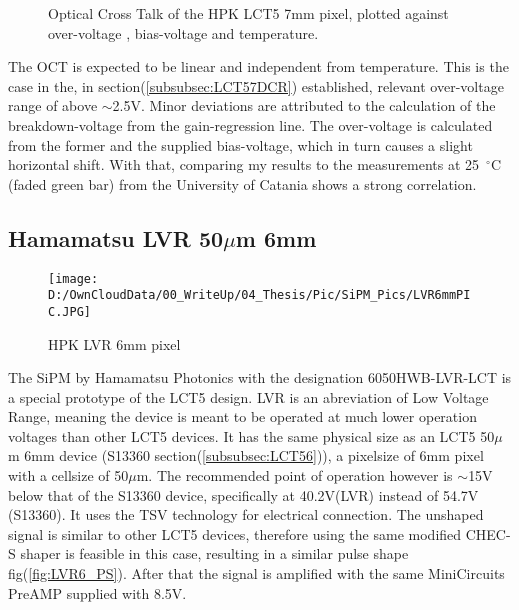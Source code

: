 \documentclass[12pt,article,type=msc,colorback,accentcolor=tud9c]{tudthesis}
\begin{document}
\begin{figure}[b!]
\begin{centering}
\caption[LCT5 7mm OCT]{Optical Cross Talk of the HPK LCT5 7mm pixel, plotted against over-voltage , bias-voltage and temperature.}
\label{fig:LCT57_OCT}
\end{centering}
\end{figure}
The OCT is expected to be linear and independent from temperature. This is the case in the, in section(\ref{subsubsec:LCT57DCR}) established, relevant over-voltage range of above $\sim$2.5V. Minor deviations are attributed to the calculation of the breakdown-voltage from the gain-regression line. The over-voltage is calculated from the former and the supplied bias-voltage, which in turn causes a slight horizontal shift. With that, comparing my results to the measurements at 25~$^\circ$C (faded green bar) from the University of Catania shows a strong correlation.



\clearpage

\subsection{Hamamatsu LVR 50$\mu$m 6mm}
\begin{wrapfigure}{R}{0.4\textwidth}
\centering
\texttt{[image: D:/OwnCloudData/00\_WriteUp/04\_Thesis/Pic/SiPM\_Pics/LVR6mmPIC.JPG]}
\caption[LCT5 LVR 6mm SiPM]{\label{fig:LVR6_pixel}HPK LVR 6mm pixel}
\end{wrapfigure}

The SiPM by Hamamatsu Photonics with the designation 6050HWB-LVR-LCT is a special prototype of the LCT5 design. LVR is an abreviation of Low Voltage Range, meaning the device is meant to be operated at much lower operation voltages than other LCT5 devices. It has the same physical size as an LCT5 50$\mu$m 6mm device (S13360 section(\ref{subsubsec:LCT56})), a pixelsize of 6mm pixel with a cellsize of 50$\mu$m. The recommended point of operation however is $\sim$15V below that of the S13360 device, specifically at 40.2V(LVR) instead of 54.7V (S13360). It uses the TSV technology for electrical connection. The unshaped signal is similar to other LCT5 devices, therefore using the same modified CHEC-S shaper is feasible in this case, resulting in a similar pulse shape fig(\ref{fig:LVR6_PS}). After that the signal is amplified with the same MiniCircuits PreAMP supplied with 8.5V.
\\
\end{document}
